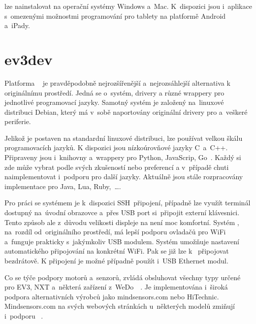 \legoSW{} lze nainstalovat na operační systémy Windows a~Mac. K~dispozici jsou i~aplikace s~omezenými možnostmi programování pro tablety na platformě Android a~iPady.


\section{ev3dev}
\label{lego-ev3dev}

Platforma \evThreeDev{}~\cite{legoMindstormsEV3_ev3dev} je pravděpodobně nejrozšířenější a~nejrozsáhlejší alternativa k originálnímu \lego{} prostředí.
Jedná se o~systém, drivery a různé wrappery pro jednotlivé programovací jazyky. 
Samotný systém je založený na~linuxové distribuci Debian, který má v~sobě naportovány originální \lego{} drivery pro \EVbrick{} a~veškeré periferie.

Jelikož je \evThreeDev{} postaven na standardní linuxové distribuci, lze používat velkou škálu programovacích jazyků. 
K dispozici jsou nízkoúrovňové jazyky C~a~C++. 
Připraveny jsou i~knihovny a~wrappery pro Python, JavaScrip, Go~\cite{legoMindstormsEV3_ev3dev-prog-lang}. 
Každý si zde může vybrat podle svých zkušeností nebo preferencí a v~případě chuti naimplementovat i~podporu pro další jazyky. 
Aktuálně jsou stále rozpracovány implementace pro Java, Lua, Ruby,~\dots{}.

Pro práci se systémem je k~dispozici SSH~připojení, případně lze využít terminál dostupný na~úvodní obrazovce a~přes USB port si~připojit externí klávesnici. 
Tento způsob ale z~důvodu velikosti displeje na  není moc komfortní. 
Systém \evThreeDev{}, na~rozdíl od~originálního \lego{} prostředí, má lepší podporu ovladačů pro WiFi a~funguje prakticky s~jakýmkoliv USB modulem. 
Systém umožňuje nastavení automatického připojování na konkrétní WiFi. Pak se již lze k~ připojovat bezdrátově.
K připojení je možné případně použít i~USB Ethernet modul.
 
Co se týče podpory \lego{} motorů a~senzorů, \evThreeDev{} zvládá obsluhovat všechny typy určené pro EV3, NXT a~některá zařízení z~WeDo~\cite{legoMindstormsEV3_ev3dev-support-motors}~\cite{legoMindstormsEV3_ev3dev-support-sensors}.
Je implementována i~široká podpora alternativních výrobců jako mindsensors.com nebo HiTechnic. 
Mindsensors.com na svých webových stránkách u~některých modelů zmiňují i~podporu \evThreeDev{}~\cite{lego_mindsensor_gyro}.  

